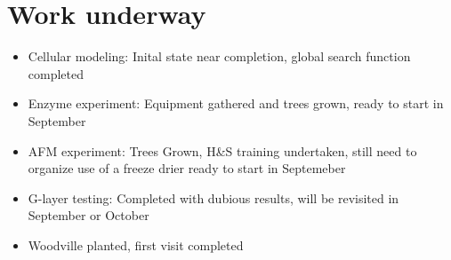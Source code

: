 \section{Work underway}
\begin{itemize}
\item Cellular modeling:
Inital state near completion, global search function completed
\end{itemize}

\begin{itemize}
\item Enzyme experiment: 
Equipment gathered and trees grown, ready to start in September
\end{itemize}
\begin{itemize}
\item AFM experiment:
Trees Grown, H\&S training undertaken, still need to organize use of a freeze drier
ready to start in Septemeber
\end{itemize}
\begin{itemize}
\item G-layer testing:
Completed with dubious results, will be revisited in September or October
\end{itemize}
\begin{itemize}
\item Woodville planted, first visit completed
\end{itemize}
  
  
  
  
  